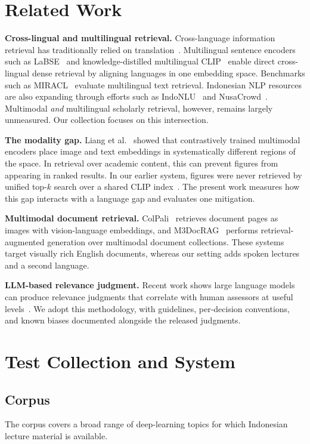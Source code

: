 \documentclass[conference]{IEEEtran}
\begin{document}
\section{Related Work}

\textbf{Cross-lingual and multilingual retrieval.} Cross-language
information retrieval has traditionally relied on translation~\cite{clir}.
Multilingual sentence encoders such as LaBSE~\cite{labse} and
knowledge-distilled multilingual CLIP~\cite{mclip} enable direct
cross-lingual dense retrieval by aligning languages in one embedding space.
Benchmarks such as MIRACL~\cite{miracl} evaluate multilingual text
retrieval. Indonesian NLP resources are also expanding through efforts such as
IndoNLU~\cite{indonlu} and NusaCrowd~\cite{nusacrowd}. Multimodal
\emph{and} multilingual scholarly retrieval, however, remains largely
unmeasured. Our collection focuses on this intersection.

\textbf{The modality gap.} Liang et al.~\cite{liang2022mind} showed that
contrastively trained multimodal encoders place image and text embeddings
in systematically different regions of the space. In retrieval over
academic content, this can prevent figures from appearing in ranked results.
In our earlier system, figures were never retrieved by unified top-$k$
search over a shared CLIP index~\cite{synthesizer}. The present work measures how this
gap interacts with a language gap and evaluates one mitigation.

\textbf{Multimodal document retrieval.} ColPali~\cite{colpali} retrieves
document pages as images with vision-language embeddings, and
M3DocRAG~\cite{m3docrag} performs retrieval-augmented generation over
multimodal document collections. These systems target visually rich English
documents, whereas our setting adds spoken lectures and a second language.

\textbf{LLM-based relevance judgment.} Recent work shows large language
models can produce relevance judgments that correlate with human assessors
at useful levels~\cite{thomas2024, umbrela}. We adopt this methodology,
with guidelines, per-decision conventions, and known biases documented
alongside the released judgments.

\section{Test Collection and System}

\subsection{Corpus}
The corpus covers a broad range of deep-learning topics for which Indonesian
lecture material is available.
\end{document}
